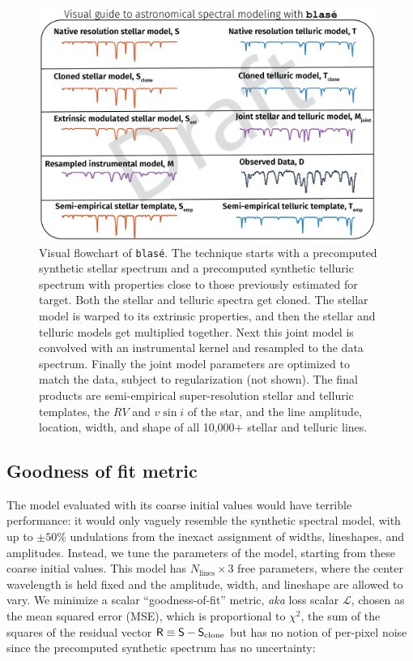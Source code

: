 \documentclass[modern]{aastex631}
\begin{document}
\begin{figure}[hbt!]
    \centering
    \includegraphics[width=0.98\textwidth]{figures/blase_flowchart01.png}
    \caption{Visual flowchart of \texttt{blas\'e}.  The technique starts with a precomputed synthetic stellar spectrum and a precomputed synthetic telluric spectrum with properties close to those previously estimated for target.  Both the stellar and telluric spectra get cloned.  The stellar model is warped to its extrinsic properties, and then the stellar and telluric models get multiplied together.  Next this joint model is convolved with an instrumental kernel and resampled to the data spectrum.  Finally the joint model parameters are optimized to match the data, subject to regularization (not shown).  The final products are semi-empirical super-resolution stellar and telluric templates, the $RV$ and $v\sin{i}$ of the star, and the line amplitude, location, width, and shape of all 10,000+ stellar and telluric lines.  }
    \label{blase_flowchart}
\end{figure}

\subsection{Goodness of fit metric}
The model evaluated with its coarse initial values would have terrible performance: it would only vaguely resemble the synthetic spectral model, with up to $\pm 50\%$ undulations from the inexact assignment of widths, lineshapes, and amplitudes. Instead, we tune the parameters of the model, starting from these coarse initial values. This model has $N_{\mathrm{lines}}\times 3$ free parameters, where the center wavelength is held fixed and the amplitude, width, and lineshape are allowed to vary. We minimize a scalar ``goodness-of-fit'' metric, \emph{aka} loss scalar $\mathcal{L}$, chosen as the mean squared error (MSE), which is proportional to $\chi^2$, the sum of the squares of the residual vector $\mathsf{R} \equiv \mathsf{S}-\mathsf{S}_{\rm clone}$ but has no notion of per-pixel noise since the precomputed synthetic spectrum has no uncertainty:
\end{document}
